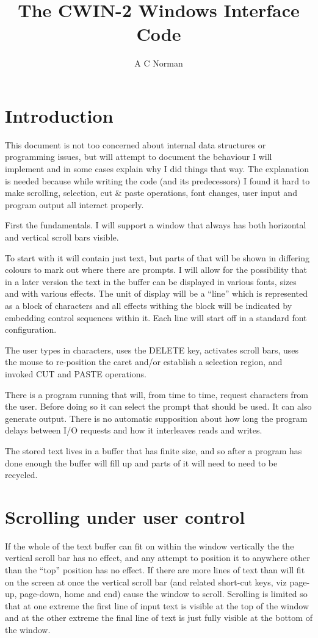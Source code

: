\documentclass[a4paper,11pt]{article}
\title{The CWIN-2 Windows Interface Code}
\author{A C Norman}
\begin{document}
\maketitle

\section{Introduction}
This document is not too concerned about internal data structures or
programming issues, but will attempt to document the behaviour I will
implement and in some cases explain why I did things that way.  The
explanation is needed because while writing the code (and its predecessors)
I found it hard to make scrolling, selection, cut \& paste operations,
font changes, user input and program output all interact properly.


First the fundamentals.  I will support a window that always has both
horizontal and vertical scroll bars visible.

To start with it will contain just text, but parts of that will be
shown in differing colours to mark out where there are prompts. I will
allow for the possibility that in a later version the text in the buffer
can be displayed in various fonts, sizes and with various effects.
The unit of display will be a ``line'' which is represented as a block
of characters and all effects withing the block will be indicated by
embedding control sequences within it. Each line will start off in
a standard font configuration.

The user types in characters, uses the DELETE key, activates scroll bars,
uses the mouse to re-position the caret and/or establish a selection
region, and invoked CUT and PASTE operations.

There is a program running that will, from time to time, request characters
from the user. Before doing so it can select the prompt that should be used.
It can also generate output. There is no automatic supposition about how
long the program delays between I/O requests and how it interleaves reads
and writes.

The stored text lives in a buffer that has finite size, and so after a
program has done enough the buffer will fill up and parts of it will need to
need to be recycled.

\section{Scrolling under user control}
If the whole of the text buffer can fit on within the window vertically
the the vertical scroll bar has no effect, and any attempt to position
it to anywhere other than the ``top'' position has no effect. If there are
more lines of text than will fit on the screen at once the vertical
scroll bar (and related short-cut keys, viz page-up, page-down, home and
end) cause the window to scroll. Scrolling is limited so that at one
extreme the first line of input text is visible at the top of the
window and at the other extreme the final line of text is just fully visible
at the bottom of the window.
\end{document}
